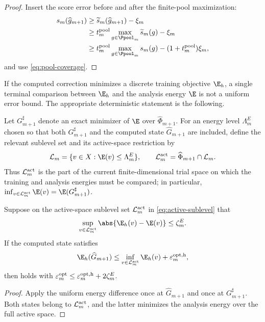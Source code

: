 \begin{proof}
Insert the score error before and after the finite-pool maximization:
\begin{align*}
s_m(\widehat g_{m+1})
&\geq\widetilde s_m(\widehat g_{m+1})-\xi_m\\
&\geq t_m^{\rm pool}\max_{g\in\Ppool_m}\widetilde s_m(g)-\xi_m\\
&\geq t_m^{\rm pool}\max_{g\in\Ppool_m}s_m(g)
 -(1+t_m^{\rm pool})\xi_m,
\end{align*}
and use \cref{eq:pool-coverage}.
\end{proof}

If the computed correction minimizes a discrete training objective $\E_h$, a single terminal comparison
between $\E_h$ and the analysis energy $\E$ is not a uniform error bound. The appropriate deterministic statement is
the following.

Let \(G_{m+1}^{\sharp}\) denote an exact minimizer of \(\E\) over
\(\widehat\Phi_{m+1}\). For an energy level \(\Lambda_m^E\) chosen so that both
\(G_{m+1}^{\sharp}\) and the computed state \(\widehat G_{m+1}\) are included, define the relevant sublevel
set and its active-space restriction by
\begin{equation}
 \mathcal L_m=\{v\in X:\E(v)\leq\Lambda_m^E\},
 \qquad \mathcal L_m^{\rm act}=\widehat\Phi_{m+1}\cap\mathcal L_m.
 \label{eq:active-sublevel}
\end{equation}
Thus \(\mathcal L_m^{\rm act}\) is the part of the current finite-dimensional trial space on which the
training and analysis energies must be compared; in particular,
\(\inf_{v\in\mathcal L_m^{\rm act}}\E(v)=\E(G_{m+1}^{\sharp})\).

\begin{lemma}
\label{lem:energy-transfer}
Suppose on the active-space sublevel set \(\mathcal L_m^{\rm act}\) in
\cref{eq:active-sublevel} that
\[
 \sup_{v\in\mathcal L_m^{\rm act}}
 \abs{\E_h(v)-\E(v)}\leq\zeta_m^E.
\]
If the computed state satisfies
\[
 \E_h(\widehat G_{m+1})\leq
 \inf_{v\in\mathcal L_m^{\rm act}}\E_h(v)+\varepsilon_m^{\rm opt,h},
\]
then  holds with
\(\varepsilon_m^{\rm opt}\leq\varepsilon_m^{\rm opt,h}+2\zeta_m^E\).
\end{lemma}

\begin{proof}
Apply the uniform energy difference once at \(\widehat G_{m+1}\) and once at
\(G_{m+1}^{\sharp}\). Both states belong to \(\mathcal L_m^{\rm act}\), and the latter minimizes the analysis
energy over the full active space.
\end{proof}
